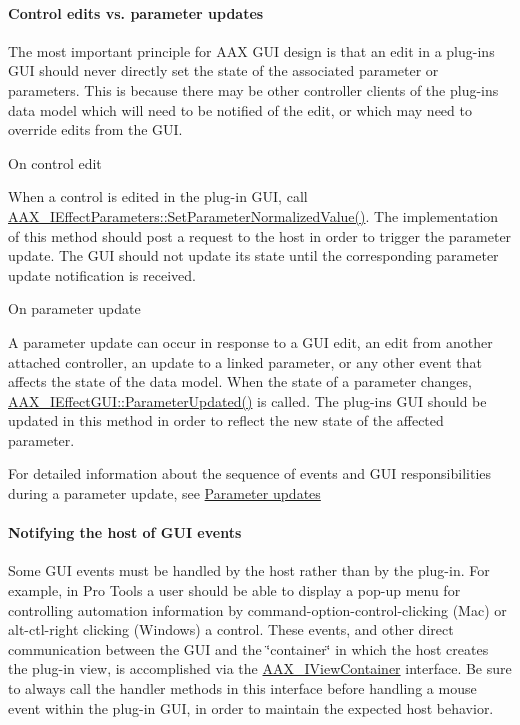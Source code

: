 \hypertarget{a00324_subsubsection__control_edits_vs_parameter_updates_}{}\paragraph{Control edits vs. parameter updates}\label{a00324_subsubsection__control_edits_vs_parameter_updates_}
 The most important principle for A\+A\+X G\+U\+I design is that an edit in a plug-\/in\textquotesingle{}s G\+U\+I should never directly set the state of the associated parameter or parameters. This is because there may be other controller clients of the plug-\/in\textquotesingle{}s data model which will need to be notified of the edit, or which may need to override edits from the G\+U\+I. 
\begin{DoxyItemize}
\item  On control edit

When a control is edited in the plug-\/in G\+U\+I, call \hyperlink{a00061_a368b0f5a761d1eda4c41b420f153a077}{A\+A\+X\+\_\+\+I\+Effect\+Parameters\+::\+Set\+Parameter\+Normalized\+Value()}. The implementation of this method should post a request to the host in order to trigger the parameter update. The G\+U\+I should not update its state until the corresponding parameter update notification is received.  
\item  On parameter update

A parameter update can occur in response to a G\+U\+I edit, an edit from another attached controller, an update to a linked parameter, or any other event that affects the state of the data model. When the state of a parameter changes, \hyperlink{a00060_a45b468fef806611581f748af9301ab4d}{A\+A\+X\+\_\+\+I\+Effect\+G\+U\+I\+::\+Parameter\+Updated()} is called. The plug-\/in\textquotesingle{}s G\+U\+I should be updated in this method in order to reflect the new state of the affected parameter.  
\end{DoxyItemize}

For detailed information about the sequence of events and G\+U\+I responsibilities during a parameter update, see \hyperlink{a00350}{Parameter updates}

\hypertarget{a00324_subsubsection__notifying_the_host_of_gui_events_}{}\paragraph{Notifying the host of G\+U\+I events}\label{a00324_subsubsection__notifying_the_host_of_gui_events_}
 Some G\+U\+I events must be handled by the host rather than by the plug-\/in. For example, in Pro Tools a user should be able to display a pop-\/up menu for controlling automation information by command-\/option-\/control-\/clicking (Mac) or alt-\/ctl-\/right clicking (Windows) a control. These events, and other direct communication between the G\+U\+I and the \char`\"{}container\char`\"{} in which the host creates the plug-\/in view, is accomplished via the \hyperlink{a00117}{A\+A\+X\+\_\+\+I\+View\+Container} interface. Be sure to always call the handler methods in this interface before handling a mouse event within the plug-\/in G\+U\+I, in order to maintain the expected host behavior.

